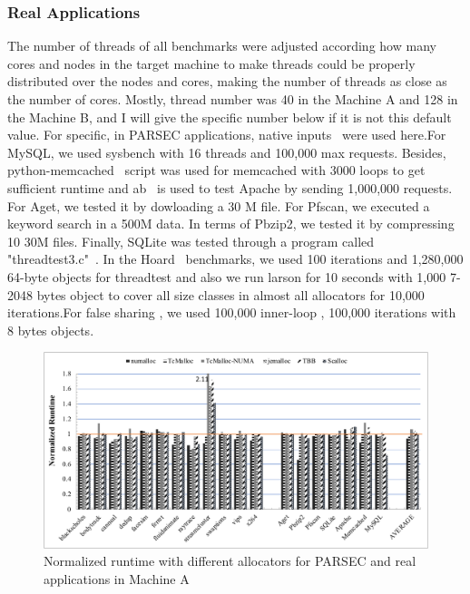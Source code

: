\subsubsection{Real Applications}
\label{sec:synthetic}

The number of threads of all benchmarks were adjusted according how many cores and nodes in the target machine to make threads could be properly distributed over the nodes and cores, making the number of threads as close as the number of cores. Mostly, thread number was 40 in the Machine A and 128 in the Machine B, and I will give the specific number below if it is not this default value. For specific, in PARSEC applications, native inputs~\cite{parsec} were used here.For MySQL, we used sysbench with 16 threads and 100,000 max requests. Besides, python-memcached~\cite{memcached} script was used for memcached with 3000 loops to get sufficient runtime and ab~\cite{apachetest} is used to test Apache by sending 1,000,000 requests. For Aget, we tested it by dowloading a 30 M file. For Pfscan, we executed a keyword search in a 500M data. In terms of Pbzip2, we tested it by compressing 10 30M files. Finally, SQLite was tested through a program called "threadtest3.c"~\cite{sqlitetest}. In the Hoard~\cite{Hoard} benchmarks, we used 100 iterations and 1,280,000 64-byte objects for threadtest and also we run larson for 10 seconds with 1,000 7-2048 bytes object to cover all size classes in almost all allocators for 10,000 iterations.For false sharing , we used 100,000 inner-loop , 100,000 iterations with 8 bytes objects. 

\begin{figure}[H]
    \centering
    \includegraphics[width=\textwidth]{figure/2-node-parsec-perf.pdf}
    \caption{Normalized runtime with different allocators for PARSEC and real applications in Machine A}
    \label{2node-parsec-perf}
\end{figure}

